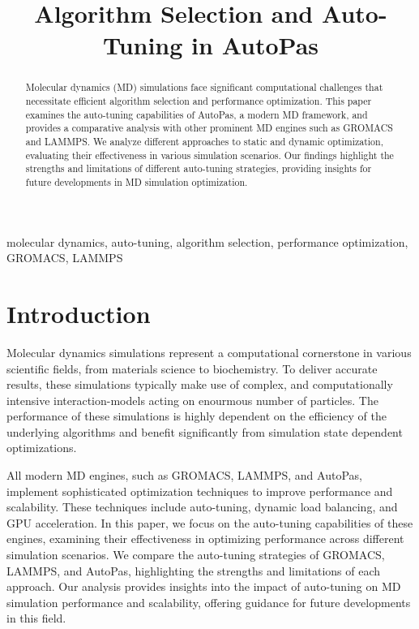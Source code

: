 \documentclass[conference]{IEEEtran}
\begin{document}
\title{Algorithm Selection and Auto-Tuning in AutoPas}

\author{
}

\maketitle

\begin{abstract}
    Molecular dynamics (MD) simulations face significant computational challenges that necessitate efficient algorithm selection and performance optimization. This paper examines the auto-tuning capabilities of AutoPas, a modern MD framework, and provides a comparative analysis with other prominent MD engines such as GROMACS and LAMMPS. We analyze different approaches to static and dynamic optimization, evaluating their effectiveness in various simulation scenarios. Our findings highlight the strengths and limitations of different auto-tuning strategies, providing insights for future developments in MD simulation optimization.
\end{abstract}

\begin{IEEEkeywords}
    molecular dynamics, auto-tuning, algorithm selection, performance optimization, GROMACS, LAMMPS
\end{IEEEkeywords}

\section{Introduction}
Molecular dynamics simulations represent a computational cornerstone in various scientific fields, from materials science to biochemistry. To deliver accurate results, these simulations typically make use of complex, and computationally intensive interaction-models acting on enourmous number of particles. The performance of these simulations is highly dependent on the efficiency of the underlying algorithms and benefit significantly from simulation state dependent optimizations. 


All modern MD engines, such as GROMACS, LAMMPS, and AutoPas, implement sophisticated optimization techniques to improve performance and scalability. These techniques include auto-tuning, dynamic load balancing, and GPU acceleration. In this paper, we focus on the auto-tuning capabilities of these engines, examining their effectiveness in optimizing performance across different simulation scenarios. We compare the auto-tuning strategies of GROMACS, LAMMPS, and AutoPas, highlighting the strengths and limitations of each approach. Our analysis provides insights into the impact of auto-tuning on MD simulation performance and scalability, offering guidance for future developments in this field.
\end{document}
